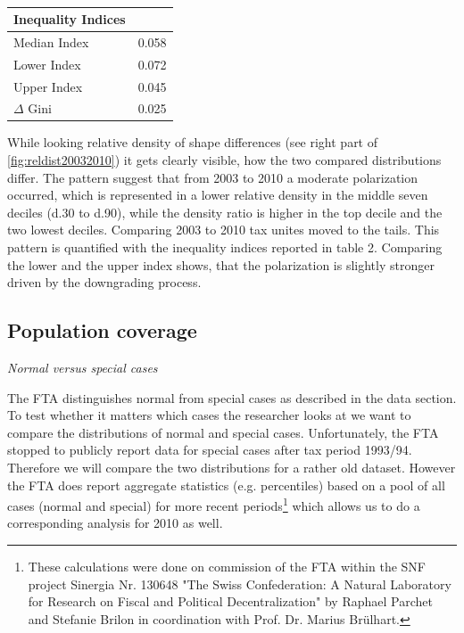\documentclass[twoside]{article}\usepackage[]{graphicx}\usepackage[]{color}
\newenvironment{knitrout}{}{} %
\begin{document}
\begin{multicols}{2}
\begin{knitrout}
\end{knitrout}


\begin{table}[H]
\caption{\label{pol20032010}} 
\begin{center}
\begin{tabular}{ll}
\hline\hline
\multicolumn{1}{l}{Inequality Indices}&\multicolumn{1}{c}{}\tabularnewline
\hline
Median Index&0.058\tabularnewline
Lower Index&0.072\tabularnewline
Upper Index&0.045\tabularnewline
$\Delta$ Gini&0.025\tabularnewline
\hline
\end{tabular}\end{center}

\end{table}



While looking relative density of shape differences (see right part of \ref{fig:reldist20032010}) it gets clearly visible, how the two compared distributions differ. The pattern suggest that from 2003 to 2010 a moderate polarization occurred, which is represented in a lower relative density in the middle seven deciles (d.30 to d.90), while the density ratio is higher in the top decile and the two lowest deciles. Comparing 2003 to 2010 tax unites moved to the tails. This pattern is quantified with the inequality indices reported in table 2. Comparing the lower and the upper index shows, that the polarization is slightly stronger driven by the downgrading process.


\subsection{Population coverage}

\emph{Normal versus special cases}

The FTA distinguishes normal from special cases as described in the data section. To test whether it matters which cases the researcher looks at we want to compare the distributions of normal and special cases. Unfortunately, the FTA stopped to publicly report data for special cases after tax period 1993/94. Therefore we will compare the two distributions for a rather old dataset. However the FTA does report aggregate statistics (e.g. percentiles) based on a pool of all cases (normal and special) for more recent periods\footnote{These calculations were done on commission of the FTA within the SNF project Sinergia Nr. 130648 "The Swiss Confederation: A Natural Laboratory for Research on Fiscal and Political Decentralization" by Raphael Parchet and Stefanie Brilon in coordination with Prof. Dr. Marius Brülhart.} which allows us to do a corresponding analysis for 2010 as well.


\end{multicols}
\end{document}
